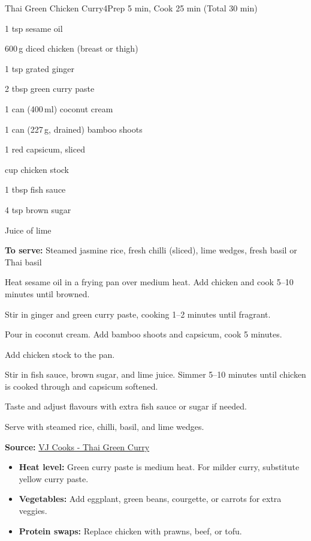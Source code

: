 \begin{recipebox}{Thai Green Chicken Curry}{4}{Prep 5 min, Cook 25 min (Total 30 min)}
\begin{ingredients}
  \item 1 tsp sesame oil
  \item 600\,g diced chicken (breast or thigh)
  \item 1 tsp grated ginger
  \item 2 tbsp green curry paste
  \item 1 can (400\,ml) coconut cream
  \item 1 can (227\,g, drained) bamboo shoots
  \item 1 red capsicum, sliced
  \item {} cup chicken stock
  \item 1 tbsp fish sauce
  \item 4 tsp brown sugar
  \item Juice of  lime
  \item \textbf{To serve:} Steamed jasmine rice, fresh chilli (sliced), lime wedges, fresh basil or Thai basil
\end{ingredients}

\begin{method}
  \item Heat sesame oil in a frying pan over medium heat. Add chicken and cook 5--10 minutes until browned.
  \item Stir in ginger and green curry paste, cooking 1--2 minutes until fragrant.
  \item Pour in coconut cream. Add bamboo shoots and capsicum, cook 5 minutes.
  \item Add chicken stock to the pan.
  \item Stir in fish sauce, brown sugar, and lime juice. Simmer 5--10 minutes until chicken is cooked through and capsicum softened.
  \item Taste and adjust flavours with extra fish sauce or sugar if needed.
  \item Serve with steamed rice, chilli, basil, and lime wedges.
\end{method}

\textbf{Source:} \href{https://vjcooks.com/chicken-thai-green-curry/#mv-creation-759-jtr}{VJ Cooks - Thai Green Curry}

\begin{notes}
\begin{itemize}
  \item \textbf{Heat level:} Green curry paste is medium heat. For milder curry, substitute yellow curry paste.
  \item \textbf{Vegetables:} Add eggplant, green beans, courgette, or carrots for extra veggies.
  \item \textbf{Protein swaps:} Replace chicken with prawns, beef, or tofu.
\end{itemize}
\end{notes}
\end{recipebox}
